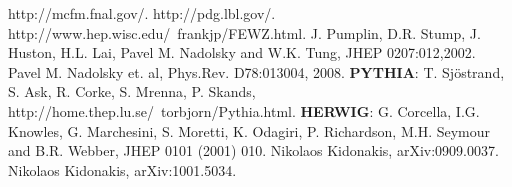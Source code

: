 \documentclass{cmspaper_pdf}
\begin{document}
\begin{thebibliography}{9}

http://mcfm.fnal.gov/.
http://pdg.lbl.gov/.
http://www.hep.wisc.edu/~frankjp/FEWZ.html.
 J. Pumplin, D.R. Stump, J. Huston, H.L. Lai, 
Pavel M. Nadolsky and W.K. Tung, JHEP 0207:012,2002. 
 Pavel M. Nadolsky et. al, Phys.Rev. D78:013004, 2008. 
 \textbf{PYTHIA}: T. Sj\"ostrand, S. Ask, R. Corke, S. Mrenna, 
P. Skands, http://home.thep.lu.se/~torbjorn/Pythia.html.
 \textbf{HERWIG}: G. Corcella, I.G. Knowles, G. Marchesini, 
S. Moretti, K. Odagiri, P. Richardson, M.H. Seymour and B.R. Webber, 
JHEP 0101 (2001) 010.
 Nikolaos Kidonakis, arXiv:0909.0037.
 Nikolaos Kidonakis, arXiv:1001.5034.
 
\end{thebibliography}
\end{document}

